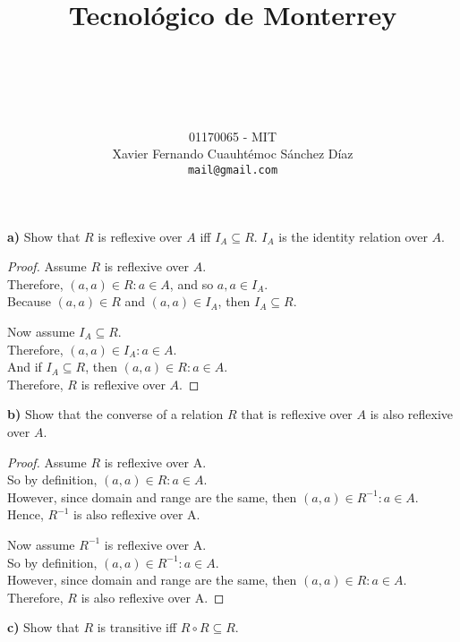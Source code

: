 \documentclass[titlepage, letterpaper, fleqn]{article}
\title{
\vspace{1in}
\textbf{Tecnológico de Monterrey} \\
\vspace{0.5in}
\textmd{\mahclass} \\
\large{\textit{\mahteacher}} \\
\vspace{0.5in}
\textsc{\mahtitle}
\author{01170065  - MIT \\
Xavier Fernando Cuauhtémoc Sánchez Díaz \\
\texttt{mail@gmail.com}}
\date{\mahdate}
}
\newcommand{\spacepls}{\vspace{5mm}}
\begin{document}
\begin{titlepage}
\maketitle
\end{titlepage}

%
%

{\large \textbf{a)} Show that \(R\) is reflexive over \(A\) iff \(I_A \subseteq R\).
\(I_A\) is the identity relation over \(A\).}

\begin{proof}
Assume \(R\) is reflexive over \(A\).\\
Therefore, \((a,a) \in R : a \in A\), and so \(a,a \in I_A\).\\
Because \((a,a) \in R\) and \((a,a) \in I_A\), then \(I_A \subseteq R\).

\spacepls

Now assume \(I_A \subseteq R\).\\
Therefore, \((a,a) \in I_A : a \in A\).\\
And if \(I_A \subseteq R\), then \((a,a) \in R : a \in A\).\\
Therefore, \(R\) is reflexive over \(A\).
\end{proof}

\spacepls

{\large \textbf{b)} Show that the converse of a relation \(R\) that is reflexive over \(A\) is also reflexive over \(A\).}

\begin{proof}
Assume \(R\) is reflexive over A.\\
So by definition, \((a,a) \in R : a \in A\).\\
However, since domain and range are the same, then \((a,a) \in R^{-1} : a \in A\).\\
Hence, \(R^{-1}\) is also reflexive over A.

\spacepls

Now assume \(R^{-1}\) is reflexive over A.\\
So by definition, \((a,a) \in R^{-1} : a \in A\).\\
However, since domain and range are the same, then \((a,a) \in R : a \in A\).\\
Therefore, \(R\) is also reflexive over A.
\end{proof}

\spacepls

{\large \textbf{c)} Show that \(R\) is transitive iff \(R \circ R \subseteq R\)}.
\end{document}
